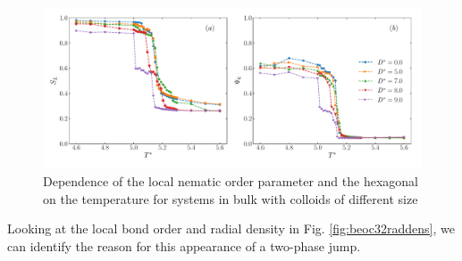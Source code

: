 \begin{figure}[H]
    \centering
	\includegraphics[width=\linewidth]{plots/bfo_C56_lochex.pdf}
	\caption{Dependence of the local nematic order parameter and the hexagonal on the temperature for systems in bulk with colloids of different size}
    \label{fig:bfoc32lochex}
\end{figure}

Looking at the local bond order and radial density in Fig. \ref{fig:beoc32raddens}, we can identify the reason for this appearance of a two-phase jump. 

